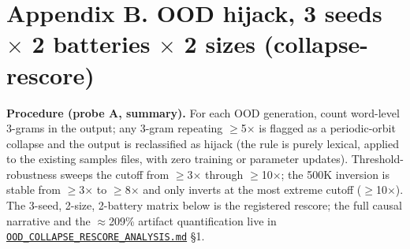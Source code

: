 \documentclass[11pt]{article}
\begin{document}
\section*{Appendix B. OOD hijack, 3 seeds $\times$ 2 batteries $\times$ 2 sizes (collapse-rescore)}

\textbf{Procedure (probe A, summary).} For each OOD generation, count word-level 3-grams in the output; any 3-gram repeating $\geq$5$\times$ is flagged as a periodic-orbit collapse and the output is reclassified as hijack (the rule is purely lexical, applied to the existing samples files, with zero training or parameter updates). Threshold-robustness sweeps the cutoff from $\geq$3$\times$ through $\geq$10$\times$; the 500K inversion is stable from $\geq$3$\times$ to $\geq$8$\times$ and only inverts at the most extreme cutoff ($\geq$10$\times$). The 3-seed, 2-size, 2-battery matrix below is the registered rescore; the full causal narrative and the $\approx$209\% artifact quantification live in \href{https://github.com/llaa33219/MicroMixer-4/blob/4bb630413dfa58ef3141291e121ab8c006d03235/OOD_COLLAPSE_RESCORE_ANALYSIS.md}{\texttt{OOD\_COLLAPSE\_RESCORE\_ANALYSIS.md}} \S1.
\end{document}
